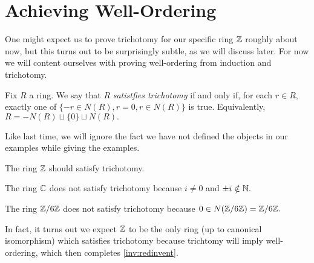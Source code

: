 \documentclass{article}
\begin{document}
\section{Achieving Well-Ordering}
One might expect us to prove trichotomy for our specific ring $\mathbb Z$ roughly about now, but this turns out to be surprisingly subtle, as we will discuss later. For now we will content ourselves with proving well-ordering from induction and trichotomy.
\begin{definition}
	Fix $R$ a ring. We say that $R$ \textit{satistfies trichotomy} if and only if, for each $r\in R,$ exactly one of $\{-r\in N(R),r=0,r\in N(R)\}$ is true. Equivalently, $R=-N(R)\sqcup\{0\}\sqcup N(R).$
\end{definition}
Like last time, we will ignore the fact we have not defined the objects in our examples while giving the examples.
\begin{example}
	The ring $\mathbb Z$ should satisfy trichotomy.
\end{example}
\begin{nex}
	The ring $\mathbb C$ does not satisfy trichotomy because $i\ne0$ and $\pm i\notin\mathbb N.$
\end{nex}
\begin{nex}
	The ring $\mathbb Z/6\mathbb Z$ does not satisfy trichotomy because $0\in N(\mathbb Z/6\mathbb Z)=\mathbb Z/6\mathbb Z.$
\end{nex}
In fact, it turns out we expect $\mathbb Z$ to be the only ring (up to canonical isomorphism) which satisfies trichotomy because trichtomy will imply well-ordering, which then completes \autoref{inv:redinvent}.
\end{document}
